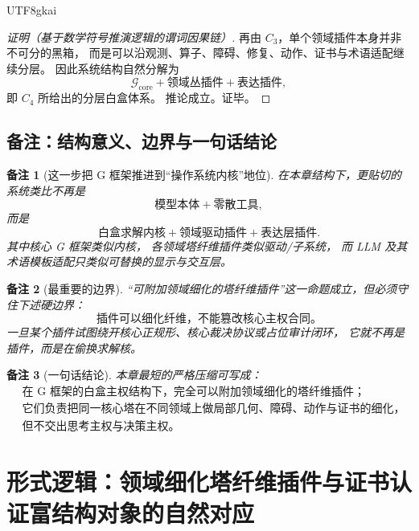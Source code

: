 \documentclass[12pt]{article}
\newtheorem{remark}{备注}[section]
\begin{document}
\begin{CJK*}{UTF8}{gkai}
\begin{proof}[证明（基于数学符号推演逻辑的谓词因果链）]
再由 $C_3$，单个领域插件本身并非不可分的黑箱，
而是可以沿观测、算子、障碍、修复、动作、证书与术语适配继续分层。
因此系统结构自然分解为
\[
  \mathcal G_{\mathrm{core}}
  +
  \text{领域丛插件}
  +
  \text{表达插件},
\]
即 $C_4$ 所给出的分层白盒体系。
推论成立。证毕。
\end{proof}

\subsection{备注：结构意义、边界与一句话结论}
\label{subsec:tex37-ch7-remarks}

\begin{remark}[这一步把 G 框架推进到“操作系统内核”地位]
在本章结构下，更贴切的系统类比不再是
\[
  \text{模型本体}+\text{零散工具},
\]
而是
\[
  \boxed{
    \text{白盒求解内核}+\text{领域驱动插件}+\text{表达层插件}.
  }
\]
其中核心 G 框架类似内核，
各领域塔纤维插件类似驱动/子系统，
而 LLM 及其术语模板适配只类似可替换的显示与交互层。
\end{remark}

\begin{remark}[最重要的边界]
“可附加领域细化的塔纤维插件”这一命题成立，但必须守住下述硬边界：
\[
  \boxed{
    \text{插件可以细化纤维，不能篡改核心主权合同。}
  }
\]
一旦某个插件试图绕开核心正规形、核心裁决协议或占位审计闭环，
它就不再是插件，而是在偷换求解核。
\end{remark}

\begin{remark}[一句话结论]
本章最短的严格压缩可写成：
\[
  \boxed{
    \begin{aligned}
      &\text{在 G 框架的白盒主权结构下，完全可以附加领域细化的塔纤维插件；}\\
      &\text{它们负责把同一核心塔在不同领域上做局部几何、障碍、动作与证书的细化，}\\
      &\text{但不交出思考主权与决策主权。}
    \end{aligned}
  }
\]
\end{remark}

\clearpage

\section{形式逻辑：领域细化塔纤维插件与证书认证富结构对象的自然对应}
\label{sec:tex37-ch8}


\end{CJK*}
\end{document}
